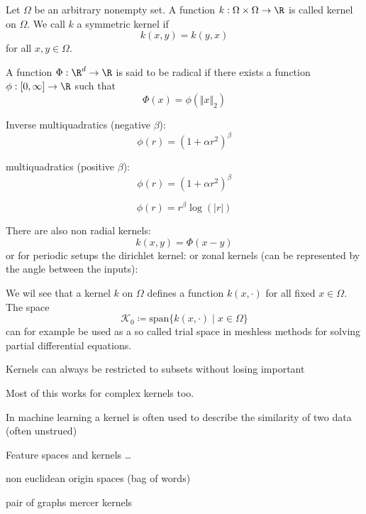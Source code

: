 \begin{definition}
    Let $\Omega$ be an arbitrary nonempty set. 
    A function $k:\Omega\times \Omega\to\R$ is called kernel on $\Omega$.
    We call $k$ a symmetric kernel if 
    \[k(x,y)=k(y,x)\]
    for all $x,y\in\Omega$.
\end{definition}

\begin{definition}
    A function $\Phi:\R^d\to\R$ is said to be radical if there exists a function $\phi:[0,\infty]\to\R$
    such that 
    \[\Phi(x)=\phi(\Vert x\Vert_2)\]
\end{definition}

\begin{example}
    Inverse multiquadratics (negative $\beta$): 
    \[\phi(r)=(1+\alpha r^2)^\beta\]
\end{example}
\begin{example}
    multiquadratics (positive $\beta$): 
    \[\phi(r)=(1+\alpha r^2)^\beta\]
\end{example}
\begin{example}[Polyharmonic]
    \[\phi(r)=r^\beta \log (|r|)\] 
\end{example}
\begin{example}
\end{example}

\begin{remark}
    There are also non radial kernels:
    \[k(x,y)=\Phi(x-y)\]
    or for periodic setups the dirichlet kernel:
    or zonal kernels (can be represented by the angle between the inputs):
\end{remark}

\begin{remark}
    We wil see that a kernel $k$ on $\Omega$ defines a function $k(x,\cdot)$ for all fixed $x\in\Omega$. The space
    \[\mathcal{K}_0\coloneqq \text{span}\{k(x,\cdot)\mid x\in\Omega\}\]
    can for example be used as a so called trial space in meshless methods for solving partial differential equations.
\end{remark}
\begin{remark}
    Kernels can always be restricted to subsets without losing important
\end{remark}
\begin{remark}
    Most of this works for complex kernels too.
\end{remark}

In machine learning a kernel is often used to describe the similarity of two data (often unstrued)

Feature spaces and kernels \dots

non euclidean origin spaces (bag of words)

pair of graphs 
mercer kernels